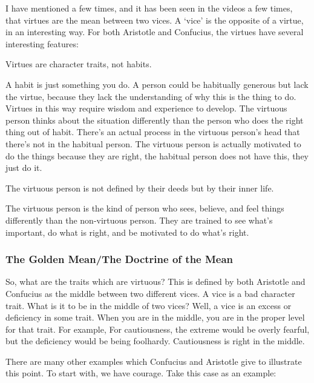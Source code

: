 I have mentioned a few times, and it has been seen in the videos a few times, that virtues are the mean between two vices. A ‘vice’ is the opposite of a virtue, in an interesting way. For both Aristotle and Confucius, the virtues have several interesting features:
\begin{center}
Virtues are character traits, not habits.
\end{center}
A habit is just something you do. A person could be habitually generous but lack the virtue, because they lack the understanding of why this is the thing to do. Virtues in this way require wisdom and experience to develop. The virtuous person thinks about the situation differently than the person who does the right thing out of habit. There’s an actual process in the virtuous person’s head that there’s not in the habitual person. The virtuous person is actually motivated to do the things because they are right, the habitual person does not have this, they just do it.
\begin{center}
The virtuous person is not defined by their deeds but by their inner life.
\end{center}
The virtuous person is the kind of person who sees, believe, and feel things differently than the non-virtuous person. They are trained to see what’s important, do what is right, and be motivated to do what’s right.

\subsubsection{The Golden Mean/The Doctrine of the Mean}

So, what are the traits which are virtuous? This is defined by both Aristotle and Confucius as the middle between two different vices. A vice is a bad character trait. What is it to be in the middle of two vices?  Well, a vice is an excess or deficiency in some trait. When you are in the middle, you are in the proper level for that trait. For example, For cautiousness, the extreme would be overly fearful, but the deficiency would be being foolhardy. Cautiousness is right in the middle. 

There are many other examples which Confucius and Aristotle give to illustrate this point. To start with, we have courage. Take this case as an example: 


